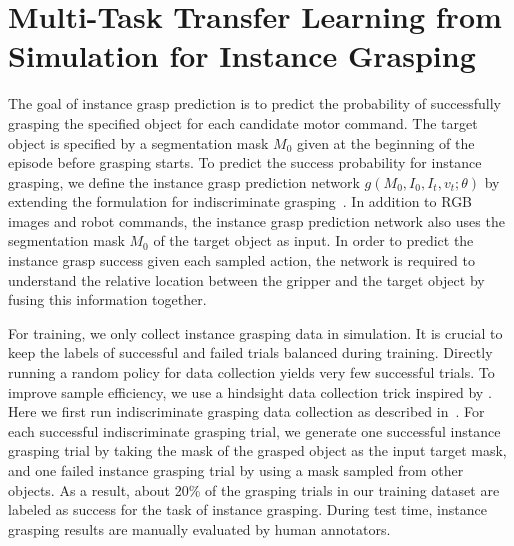 \documentclass[letterpaper, 10 pt, conference]{ieeeconf}  %
\begin{document}
\section{Multi-Task Transfer Learning from Simulation for Instance Grasping}%
The goal of instance grasp prediction is to predict the probability of successfully grasping the specified object for each candidate motor command. The target object is specified by a segmentation mask $M_0$ given at the beginning of the episode before grasping starts. To predict the success probability for instance grasping, we define the instance grasp prediction network $g(M_0, I_0, I_t, v_t; \theta)$ by extending the formulation for indiscriminate grasping~\cite{levine2016learning}. In addition to RGB images and robot commands, the instance grasp prediction network also uses the segmentation mask $M_0$ of the target object as input. In order to predict the instance grasp success given each sampled action, the network is required to understand the relative location between the gripper and the target object by fusing this information together.

For training, we only collect instance grasping data in simulation. It is crucial to keep the labels of successful and failed trials balanced during training. Directly running a random policy for data collection yields very few successful trials. To improve sample efficiency, we use a hindsight data collection trick inspired by \cite{Andrychowicz2017HindsightER}. Here we first run indiscriminate grasping data collection as described in~\cite{levine2016learning}. For each successful indiscriminate grasping trial, we generate one successful instance grasping trial by taking the mask of the grasped object as the input target mask, and one failed instance grasping trial by using a mask sampled from other objects. As a result, about 20\% of the grasping trials in our training dataset are labeled as success for the task of instance grasping. During test time, instance grasping results are manually evaluated by human annotators.
\end{document}
